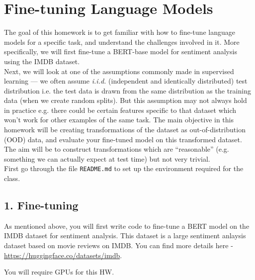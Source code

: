 \documentclass{article}
\theoremstyle{case}
\theoremstyle{definition}
\begin{document}
\section*{Fine-tuning Language Models}

The goal of this homework is to get familiar with how to fine-tune language models for a specific task, and understand the challenges involved in it. More specifically, we will first fine-tune a BERT-base model for sentiment analysis using the IMDB dataset.\\


Next, we will look at one of the assumptions commonly made in supervised learning --- we often assume \emph{i.i.d.} (independent and identically distributed) test distribution i.e. the test data is drawn from the same distribution as the training data (when we create random splits). But this assumption may not always hold in practice e.g. there could be certain features specific to that dataset which won't work for other examples of the same task. The main objective in this homework will be creating transformations of the dataset as out-of-distribution (OOD) data, and evaluate your fine-tuned model on this transformed dataset. The aim will be to construct transformations which are ``reasonable'' (e.g. something we can actually expect at test time) but not very trivial.\\

First go through the file \texttt{README.md} to set up the environment required for the class.

\subsection*{1. Fine-tuning}

As mentioned above, you will first write code to fine-tune a BERT model on the IMDB dataset for sentiment analysis. This dataset is a large sentiment anlaysis dataset based on movie reviews on IMDB. You can find more details here - \url{https://huggingface.co/datasets/imdb}.

You will require GPUs for this HW.
\end{document}
